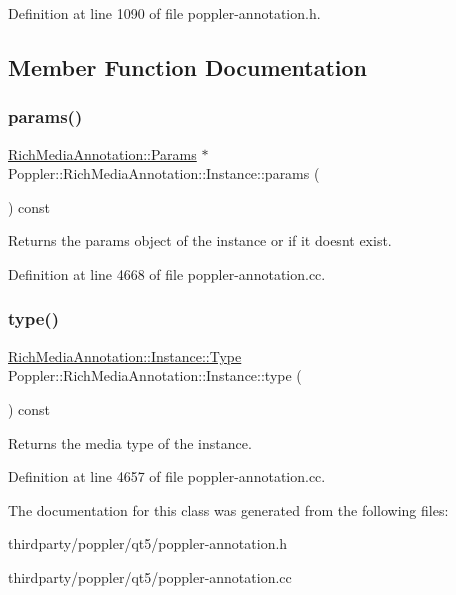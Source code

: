 Definition at line 1090 of file poppler-\/annotation.\+h.



\subsection{Member Function Documentation}
\mbox{\label{class_poppler_1_1_rich_media_annotation_1_1_instance_ada9518a7bc3d819c70e8739aa00b2922}} 
\subsubsection{\texorpdfstring{params()}{params()}}
{\footnotesize\ttfamily \hyperlink{class_poppler_1_1_rich_media_annotation_1_1_params}{Rich\+Media\+Annotation\+::\+Params} $\ast$ Poppler\+::\+Rich\+Media\+Annotation\+::\+Instance\+::params (\begin{DoxyParamCaption}{ }\end{DoxyParamCaption}) const}

Returns the params object of the instance or {} if it doesn\textquotesingle{}t exist. 

Definition at line 4668 of file poppler-\/annotation.\+cc.

\mbox{\label{class_poppler_1_1_rich_media_annotation_1_1_instance_aa6958f1d141612cf71cda12edbcf27b0}} 
\subsubsection{\texorpdfstring{type()}{type()}}
{\footnotesize\ttfamily \hyperlink{class_poppler_1_1_rich_media_annotation_1_1_instance_ae1f530939f7bd947ac119b7315f5ec44}{Rich\+Media\+Annotation\+::\+Instance\+::\+Type} Poppler\+::\+Rich\+Media\+Annotation\+::\+Instance\+::type (\begin{DoxyParamCaption}{ }\end{DoxyParamCaption}) const}

Returns the media type of the instance. 

Definition at line 4657 of file poppler-\/annotation.\+cc.



The documentation for this class was generated from the following files\+:\begin{DoxyCompactItemize}
\item 
thirdparty/poppler/qt5/poppler-\/annotation.\+h\item 
thirdparty/poppler/qt5/poppler-\/annotation.\+cc\end{DoxyCompactItemize}
